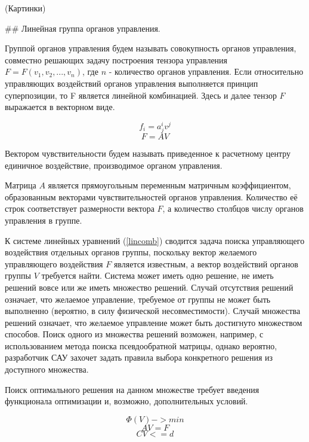 (Картинки)

## Линейная группа органов управления.

Группой органов управления будем называть совокупность органов управления, совместно решающих задачу построения тензора управления $F = F(v_1, v_2, ..., v_n)$, где $n$ - количество органов управления. Если относительно управляющих воздействий органов управления выполняется принцип суперпозиции, то F является линейной комбинацией. Здесь и далее тензор $F$ выражается в векторном виде. 

\begin{equation}f_i=a^i_jv^j\end{equation}
\begin{equation} \label{lincomb}  F=AV\end{equation}

Вектором чувствительности будем называть приведенное к расчетному центру единичное воздействие, производимое органом управления.

Матрица $A$ является прямоугольным переменным матричным коэффициентом, образованным векторами чувствительностей органов управления. Количество её строк соответствует размерности вектора $F$, а количество столбцов числу органов управления в группе.

К системе линейных уравнений (\ref{lincomb}) сводится задача поиска управляющего воздействия отдельных органов группы, поскольку вектор желаемого управляющего воздействия $F$ является известным, а вектор воздействий органов группы $V$ требуется найти. Система может иметь одно решение, не иметь решений вовсе или же иметь множество решений. Случай отсутствия решений означает, что желаемое управление, требуемое от группы не может быть выполненно (вероятно, в силу физической несовместимости). Случай множества решений означает, что желаемое управление может быть достигнуто множеством способов. Поиск одного из множества решений возможен, например, с использованием метода поиска псевдообратной матрицы, однако вероятно, разработчик САУ захочет задать правила выбора конкретного решения из доступного множества.

Поиск оптимального решения на данном множестве требует введения функционала оптимизации и, возможно, дополнительных условий.

\begin{equation}\Phi(V) -> min\end{equation}
\begin{equation}AV = F\end{equation}
\begin{equation}CV <= d\end{equation}

